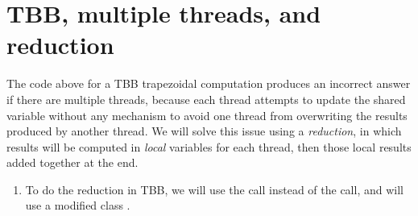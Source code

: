 \documentclass[letterpaper,10pt,openany,oneside]{sphinxmanual}
\begin{document}
\chapter{TBB, multiple threads, and reduction}
\label{MultipleThreadsAndReduction/MultipleThreadsAndReduction:tbb-multiple-threads-and-reduction}\label{MultipleThreadsAndReduction/MultipleThreadsAndReduction::doc}
The code above for a TBB trapezoidal computation produces an incorrect answer if there are multiple threads, because each thread attempts to update the shared variable  without any mechanism to avoid one thread from overwriting the results produced by another thread.  We will solve this issue using a \emph{reduction}, in which results will be computed in \emph{local} variables for each thread, then those local results added together at the end.
\begin{enumerate}
\item {} 
To do the reduction in TBB, we will use the  call instead of the  call, and will use a modified class .

\end{enumerate}
\end{document}
